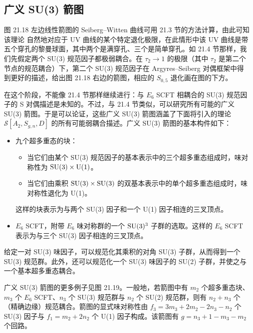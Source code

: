 \subsection{广义 SU(3) 箭图}

图 21.18 左边线性箭图的 Seiberg–Witten 曲线可用 21.3 节的方法计算，由此可知该理论
自然地对应于 UV 曲线的某个特定退化极限，在此情形中该 UV 曲线是带五个穿孔的黎曼球面，其中两个是满穿孔、三个是简单穿孔。如 21.4 节那样，我们先假定两个 SU(3) 规范因子都极弱耦合。在 $\tau_2\to1$ 的极限（其中 $\tau_2$ 是第二个节点的规范耦合）下，第二个 SU(3) 规范因子在 Argyres–Seiberg 对偶框架中得到更好的描述，给出图 21.18 右边的箭图，相应的 $S_{0,5}$ 退化画在图的下方。


在这个阶段，不能像 21.4 节那样继续进行：与 $E_6$ SCFT 相耦合的 SU(3) 规范因子的 S 对偶描述是未知的。不过，与 21.4 节类似，可以研究所有可能的广义 SU(3) 箭图。于是可以论证，这些广义 SU(3) 箭图涵盖了下面将引入的理论 $\mathcal{S}[A_2,S_{g,n},D]$ 的所有可能弱耦合描述。广义 SU(3) 箭图的基本构件如下：
\begin{itemize}
\item 九个超多重态的块：
\begin{itemize}
\item 当它们由某个 SU(3) 规范因子的基本表示中的三个超多重态组成时，味对称性为 $\operatorname{SU}(3)\times\operatorname{U}(1)$。
\item 当它们由乘积 $\operatorname{SU}(3)\times\operatorname{SU}(3)$ 的双基本表示中的单个超多重态组成时，味对称性退化为 U(1)。
\end{itemize}
这样的块表示为与两个 SU(3) 因子和一个 U(1) 因子相连的三叉顶点。
\item $E_6$ SCFT，附带 $E_6$ 味对称群的一个 $\operatorname{SU}(3)^3$ 子群的选取。这样的 $E_6$ SCFT 表示为与三个 SU(3) 因子相连的三叉顶点。
\end{itemize}
给定一对 SU(3) 味因子，可以规范化其乘积的对角 SU(3) 子群，从而得到一个 SU(3) 规范群。此外，还可以规范化一个 SU(3) 味因子的 SU(2) 子群，并使之与一个基本超多重态耦合。

广义 SU(3) 箭图的更多例子见图 21.19。一般地，若箭图中有 $m_2$ 个超多重态块、$m_3$ 个 $E_6$ SCFT、$n_3$ 个 SU(3) 规范群与 $n_2$ 个 SU(2) 规范群，则有 $n_2+n_3$ 个（精确边缘）规范耦合。箭图的显式味对称性由 $f_3=3m_3+2m_2-2n_3-n_2$ 个 SU(3) 因子与 $f_1=m_2+2n_2$ 个 U(1) 因子构成。该箭图有 $g=n_3+1-m_3-m_2$ 个回路。


